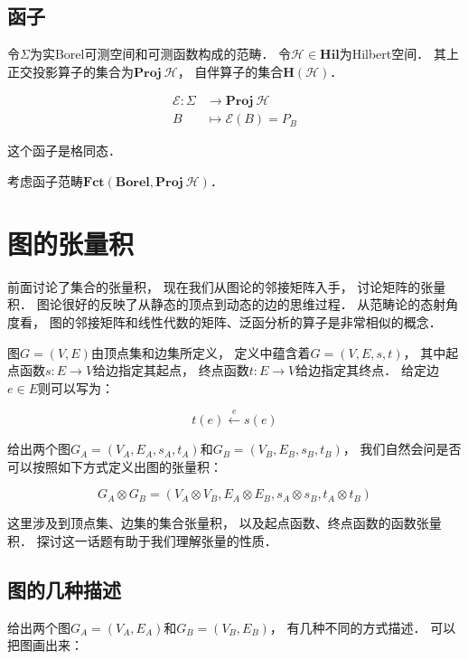 \documentclass[10pt, openany]{book}
\begin{document}
\section{函子}

令$\Sigma$为实Borel可测空间和可测函数构成的范畴．
令$\mathcal H \in \textbf{Hil}$为Hilbert空间．
其上正交投影算子的集合为$\textbf{Proj} \ \mathcal H$，
自伴算子的集合$\textbf{H}(\mathcal H)$．

$$
\begin{aligned}
\mathcal E: \Sigma &\to \textbf{Proj} \ \mathcal H \\
B &\mapsto \mathcal E(B) = P_B
\end{aligned}
$$

这个函子是格同态．

考虑函子范畴$\textbf{Fct}(\textbf{Borel},\textbf{Proj} \ \mathcal H)$．


\chapter{图的张量积}

前面讨论了集合的张量积，
现在我们从图论的邻接矩阵入手，
讨论矩阵的张量积．
图论很好的反映了从静态的顶点到动态的边的思维过程．
从范畴论的态射角度看，
图的邻接矩阵和线性代数的矩阵、泛函分析的算子是非常相似的概念．

图$G=(V,E)$由顶点集和边集所定义，
定义中蕴含着$G=(V,E,s,t)$，
其中起点函数$s:E \to V$给边指定其起点，
终点函数$t:E \to V$给边指定其终点．
给定边$e \in E$则可以写为：

\begin{equation}
t(e) \stackrel{e}{\longleftarrow} s(e)
\end{equation}
\label{eq:edge-st}

给出两个图$G_A=(V_A,E_A,s_A,t_A)$和$G_B=(V_B,E_B,s_B,t_B)$，
我们自然会问是否可以按照如下方式定义出图的张量积：

\begin{equation}
G_A \otimes G_B = (V_A \otimes V_B,E_A \otimes E_B,s_A \otimes s_B,t_A \otimes t_B)
\end{equation}
\label{eq:graph-tensor}

这里涉及到顶点集、边集的集合张量积，
以及起点函数、终点函数的函数张量积．
探讨这一话题有助于我们理解张量的性质．

\section{图的几种描述}

给出两个图$G_A=(V_A,E_A)$和$G_B=(V_B,E_B)$，
有几种不同的方式描述．
可以把图画出来：
\end{document}
